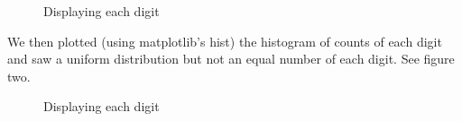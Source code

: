 \documentclass[12pt]{report}
\begin{document}
\begin{figure}
\caption{Displaying each digit}
\end{figure}


We then plotted (using matplotlib's hist) the histogram of counts of each digit and saw a uniform distribution but not an equal number of each digit. See figure two.

\begin{figure}
\centering
{}
\caption{Displaying each digit}
\end{figure}
\end{document}
